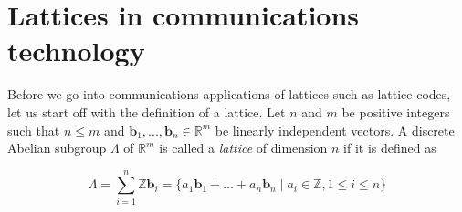 \documentclass[english,12pt,a4paper,pdftex,sci,utf8]{aaltothesis}
\begin{document}
\clearpage

\section{Lattices in communications technology}
\label{sec:lattices}
Before we go into communications applications of lattices such as lattice codes, let us start off with the definition of a lattice. Let $n$ and $m$ be positive integers such that $n \leq m$ and $\mathbf{b}_1, ... , \mathbf{b}_n \in \mathbb{R}^m$ be linearly independent vectors. A discrete Abelian subgroup $\Lambda$ of $\mathbb{R}^m$ is called a \emph{lattice} of dimension $n$ if it is defined as

\begin{equation}
\Lambda = \sum_{i=1}^{n} \mathbb{Z}\mathbf{b}_i = \{a_1\mathbf{b}_1 + \ldots + a_n\mathbf{b}_n \mid a_i \in \mathbb{Z}, 1 \leq i \leq n\}\label{eq:lattice}
\end{equation}
\end{document}
